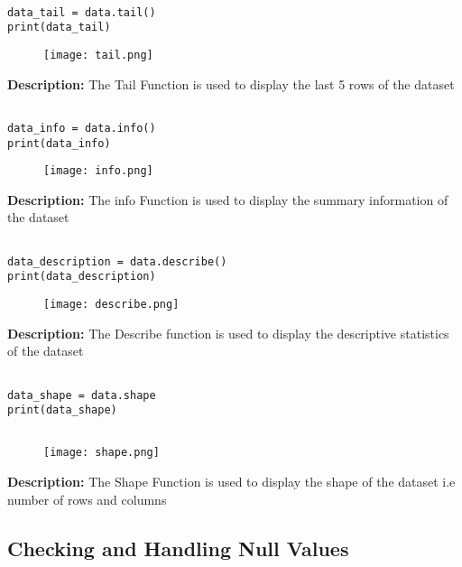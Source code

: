\documentclass{article}
\begin{document}
\begin{lstlisting}

data_tail = data.tail()
print(data_tail)
\end{lstlisting}

\begin{figure}[H]
    \centering
    \texttt{[image: tail.png]}
\end{figure}
\textbf{Description:}
The Tail Function is used to display the last 5 rows of the dataset


\begin{lstlisting}

data_info = data.info()
print(data_info)  
\end{lstlisting}
\begin{figure}[H]
    \centering
    \texttt{[image: info.png]}
\end{figure}
\textbf{Description:}
The info Function is used to display the summary information of the dataset

\begin{lstlisting}

data_description = data.describe()
print(data_description)   
\end{lstlisting}
\begin{figure}[H]
    \centering
    \texttt{[image: describe.png]}
\end{figure}
\textbf{Description:}
The Describe function is used to display the descriptive statistics of the dataset


\begin{lstlisting}

data_shape = data.shape
print(data_shape)
    
\end{lstlisting}
\begin{figure}[H]
    \centering
    \texttt{[image: shape.png]}
\end{figure}
\textbf{Description:}
The Shape Function is used to display the shape of the dataset i.e number of rows and columns



\subsection{Checking and Handling Null Values}
\end{document}
